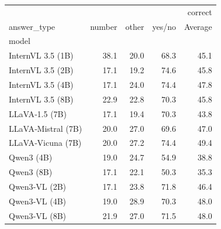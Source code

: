 \begin{tabular}{lrrrr}
\toprule
 & \multicolumn{4}{r}{correct} \\
answer_type & number & other & yes/no & Average \\
model &  &  &  &  \\
\midrule
InternVL 3.5 (1B) & 38.1 & 20.0 & 68.3 & 45.1 \\
InternVL 3.5 (2B) & 17.1 & 19.2 & 74.6 & 45.8 \\
InternVL 3.5 (4B) & 17.1 & 24.0 & 74.4 & 47.8 \\
InternVL 3.5 (8B) & 22.9 & 22.8 & 70.3 & 45.8 \\
LLaVA‑1.5 (7B) & 17.1 & 19.4 & 70.3 & 43.8 \\
LLaVA‑Mistral (7B) & 20.0 & 27.0 & 69.6 & 47.0 \\
LLaVA‑Vicuna (7B) & 20.0 & 27.2 & 74.4 & 49.4 \\
Qwen3 (4B) & 19.0 & 24.7 & 54.9 & 38.8 \\
Qwen3 (8B) & 17.1 & 22.1 & 50.3 & 35.3 \\
Qwen3‑VL (2B) & 17.1 & 23.8 & 71.8 & 46.4 \\
Qwen3‑VL (4B) & 19.0 & 28.9 & 70.3 & 48.0 \\
Qwen3‑VL (8B) & 21.9 & 27.0 & 71.5 & 48.0 \\
\bottomrule
\end{tabular}
